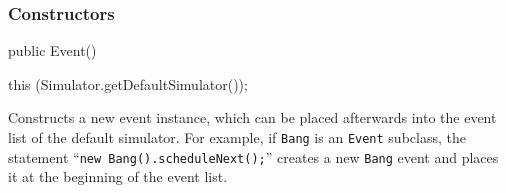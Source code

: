 \subsubsection* {Constructors}

\begin{code}

   public Event() \begin{hide} {
      this (Simulator.getDefaultSimulator());
   } \end{hide}
\end{code}
   \begin{tabb} Constructs a new event instance, which can be placed afterwards
    into the event list of the default simulator.
    For example, if \texttt{Bang} is an \texttt{Event} subclass,
    the statement ``\texttt{new Bang().scheduleNext();}'' creates a new
    \texttt{Bang} event and places it at the beginning of the event list.
   \end{tabb}
